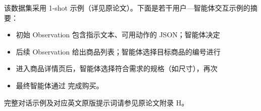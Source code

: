 该数据集采用 1-shot 示例（详见原论文）。下面是若干用户—智能体交互示例的摘要：
\begin{itemize}
    \item 初始 Observation 包含指示文本、可用动作的 JSON；智能体决定
    \item 后续 Observation 给出商品列表；智能体选择目标商品的编号进行
    \item 进入商品详情页后，智能体选择符合需求的规格（如尺寸），再次
    \item 最终智能体通过  完成购买。
\end{itemize}
完整对话示例及对应英文原版提示词请参见原论文附录 H。
